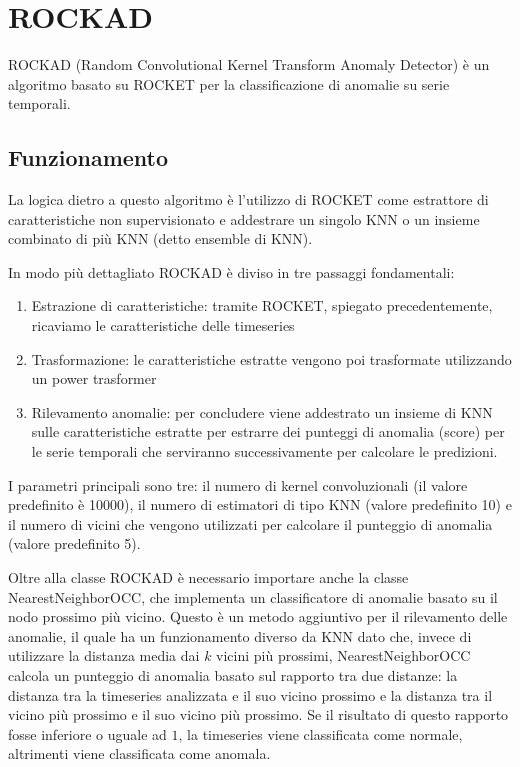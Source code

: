 
\section{ROCKAD}
ROCKAD (Random Convolutional Kernel Transform Anomaly Detector) è un algoritmo basato su ROCKET per la classificazione di anomalie su serie temporali.
\subsection{Funzionamento}
La logica dietro a questo algoritmo è l'utilizzo di ROCKET come estrattore di caratteristiche non supervisionato e addestrare un singolo KNN o un insieme combinato di più KNN (detto ensemble di KNN).

In modo più dettagliato ROCKAD è diviso in tre passaggi fondamentali:
\begin{enumerate}
    \item Estrazione di caratteristiche: tramite ROCKET, spiegato precedentemente, ricaviamo le caratteristiche delle timeseries
    \item Trasformazione: le caratteristiche estratte vengono poi trasformate utilizzando un power trasformer
    \item Rilevamento anomalie: per concludere viene addestrato un insieme di KNN sulle caratteristiche estratte per estrarre dei punteggi di anomalia (score) per le serie temporali che serviranno successivamente per calcolare le predizioni.
\end{enumerate}

I parametri principali sono tre: il numero di kernel convoluzionali (il valore predefinito è 10000), il numero di estimatori di tipo KNN (valore predefinito 10) e il numero di vicini che vengono utilizzati per calcolare il punteggio di anomalia (valore predefinito 5).

Oltre alla classe ROCKAD è necessario importare anche la classe NearestNeighborOCC, che implementa un classificatore di anomalie basato su il nodo prossimo più vicino.
Questo è un metodo aggiuntivo per il rilevamento delle anomalie, il quale ha un funzionamento diverso da KNN dato che, invece di utilizzare la distanza media dai $k$ vicini più prossimi, NearestNeighborOCC calcola un punteggio di anomalia basato sul rapporto tra due distanze: la distanza tra la timeseries analizzata e il suo vicino prossimo e la distanza tra il vicino più prossimo e il suo vicino più prossimo.
Se il risultato di questo rapporto fosse inferiore o uguale ad $1$, la timeseries viene classificata come normale, altrimenti viene classificata come anomala.

